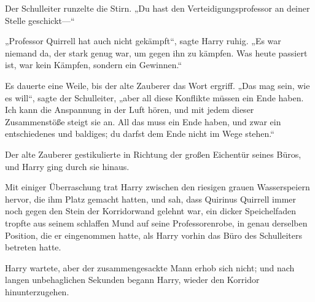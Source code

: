 Der Schulleiter runzelte die Stirn. „Du hast den Verteidigungsprofessor an deiner Stelle geschickt—“

„Professor Quirrell hat auch nicht gekämpft“, sagte Harry ruhig. „Es war niemand da, der stark genug war, um gegen ihn zu kämpfen. Was heute passiert ist, war kein Kämpfen, sondern ein Gewinnen.“

Es dauerte eine Weile, bis der alte Zauberer das Wort ergriff. „Das mag sein, wie es will“, sagte der Schulleiter, „aber all diese Konflikte müssen ein Ende haben. Ich kann die Anspannung in der Luft hören, und mit jedem dieser Zusammenstöße steigt sie an. All das muss ein Ende haben, und zwar ein entschiedenes und baldiges; du darfst dem Ende nicht im Wege stehen.“

Der alte Zauberer gestikulierte in Richtung der großen Eichentür seines Büros, und Harry ging durch sie hinaus.

\later

Mit einiger Überraschung trat Harry zwischen den riesigen grauen Wasserspeiern hervor, die ihm Platz gemacht hatten, und sah, dass Quirinus Quirrell immer noch gegen den Stein der Korridorwand gelehnt war, ein dicker Speichelfaden tropfte aus seinem schlaffen Mund auf seine Professorenrobe, in genau derselben Position, die er eingenommen hatte, als Harry vorhin das Büro des Schulleiters betreten hatte.

Harry wartete, aber der zusammengesackte Mann erhob sich nicht; und nach langen unbehaglichen Sekunden begann Harry, wieder den Korridor hinunterzugehen.

